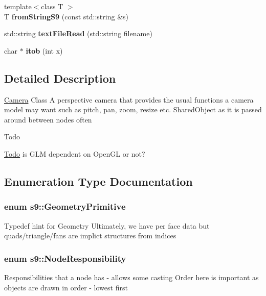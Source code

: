 \begin{DoxyCompactItemize}
\item 
\hypertarget{namespaces9_ad07b19d428eddf62cd78b9188b714178}{{\footnotesize template$<$class T $>$ }\\T {\bfseries from\-String\-S9} (const std\-::string \&s)}\label{namespaces9_ad07b19d428eddf62cd78b9188b714178}

\item 
\hypertarget{namespaces9_a59dc39969cfc135e714655dcbd685cd2}{std\-::string {\bfseries text\-File\-Read} (std\-::string filename)}\label{namespaces9_a59dc39969cfc135e714655dcbd685cd2}

\item 
\hypertarget{namespaces9_a23dbe14204162b4e6204035bc48b3bb0}{char $\ast$ {\bfseries itob} (int x)}\label{namespaces9_a23dbe14204162b4e6204035bc48b3bb0}

\end{DoxyCompactItemize}


\subsection{Detailed Description}
\hyperlink{classs9_1_1Camera}{Camera} Class A perspective camera that provides the usual functions a camera model may want such as pitch, pan, zoom, resize etc. Shared\-Object as it is passed around between nodes often

\begin{DoxyRefDesc}{Todo}
\item[\hyperlink{todo__todo000037}{Todo}]is G\-L\-M dependent on Open\-G\-L or not? \end{DoxyRefDesc}


\subsection{Enumeration Type Documentation}
\hypertarget{namespaces9_ad57d1332f8fd67d23f6a1d3520ab785c}{
\subsubsection[{Geometry\-Primitive}]{\setlength{\rightskip}{0pt plus 5cm}enum {\bf s9\-::\-Geometry\-Primitive}}}\label{namespaces9_ad57d1332f8fd67d23f6a1d3520ab785c}
Typedef hint for Geometry Ultimately, we have per face data but quads/triangle/fans are implict structures from indices \hypertarget{namespaces9_a5c291cd938e865ef990a7f53eec62f36}{
\subsubsection[{Node\-Responsibility}]{\setlength{\rightskip}{0pt plus 5cm}enum {\bf s9\-::\-Node\-Responsibility}}}\label{namespaces9_a5c291cd938e865ef990a7f53eec62f36}
Responsibilities that a node has -\/ allows some casting Order here is important as objects are drawn in order -\/ lowest first 